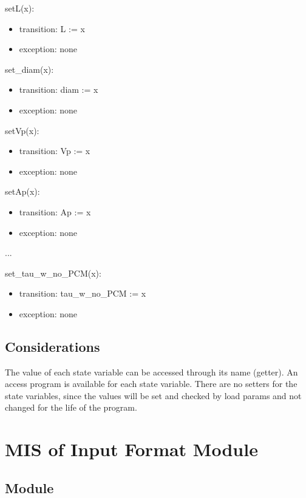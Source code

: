 \documentclass[12pt]{article}
\begin{document}
\noindent setL(x):
\begin{itemize}
\item transition: L := x
\item exception: none
\end{itemize}

\noindent set\_diam(x):
\begin{itemize}
\item transition: diam := x
\item exception: none
\end{itemize}

\noindent setVp(x):
\begin{itemize}
\item transition: Vp := x
\item exception: none
\end{itemize}

\noindent setAp(x):
\begin{itemize}
\item transition: Ap := x
\item exception: none
\end{itemize}

...

\noindent set\_tau\_w\_no\_PCM(x):
\begin{itemize}
\item transition: tau\_w\_no\_PCM := x
\item exception: none
\end{itemize}

\subsection{Considerations}

The value of each state variable can be accessed through its name (getter).  An
access program is available for each state variable.  There are no setters for
the state variables, since the values will be set and checked by load params and
not changed for the life of the program.

\newpage

\section{MIS of Input Format Module} \label{Load}

\subsection{Module}
\end{document}
